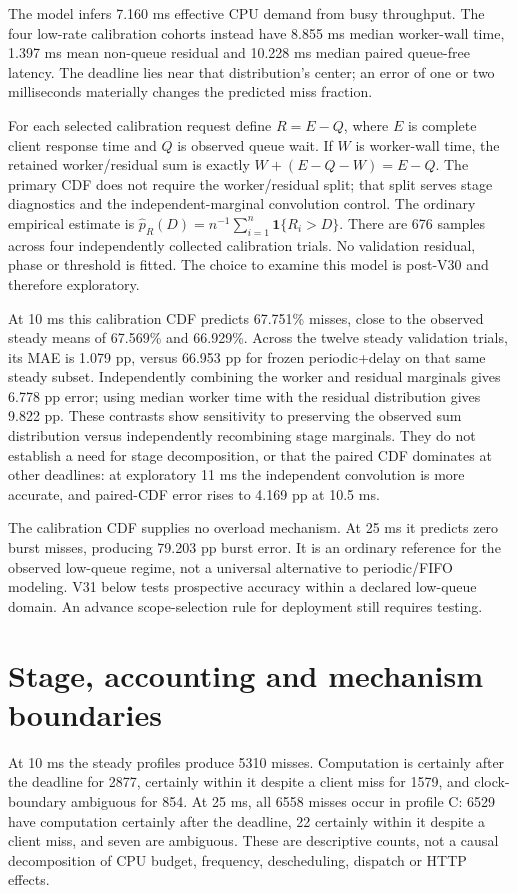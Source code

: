 \documentclass[11pt,a4paper]{article}
\begin{document}
The model infers 7.160 ms effective CPU demand from busy throughput. The four
low-rate calibration cohorts instead have 8.855 ms median worker-wall time,
1.397 ms mean non-queue residual and 10.228 ms median paired queue-free
latency. The deadline lies near that distribution's center; an error of one or
two milliseconds materially changes the predicted miss fraction.

For each selected calibration request define $R=E-Q$, where $E$ is complete
client response time and $Q$ is observed queue wait. If $W$ is worker-wall time,
the retained worker/residual sum is exactly $W+(E-Q-W)=E-Q$. The primary CDF
does not require the worker/residual split; that split serves stage diagnostics
and the independent-marginal convolution control. The ordinary empirical
estimate is $\hat p_R(D)=n^{-1}\sum_{i=1}^{n}\mathbf{1}\{R_i>D\}$.
There are 676 samples across four independently collected calibration trials.
No validation residual, phase or threshold is fitted. The choice to examine
this model is post-V30 and therefore exploratory.

At 10 ms this calibration CDF predicts 67.751\% misses, close to the observed
steady means of 67.569\% and 66.929\%. Across the twelve steady validation trials,
its MAE is 1.079 pp, versus 66.953 pp for frozen periodic+delay on that same
steady subset. Independently combining the worker and residual marginals gives
6.778 pp error; using median worker time with the residual distribution gives
9.822 pp. These contrasts show sensitivity to preserving the observed sum
distribution versus independently recombining stage marginals. They do not
establish a need for stage decomposition, or that the paired
CDF dominates at other deadlines: at exploratory 11 ms the independent
convolution is more accurate, and paired-CDF error rises to 4.169 pp at 10.5 ms.

The calibration CDF supplies no overload mechanism. At 25 ms it predicts zero
burst misses, producing 79.203 pp burst error. It is an ordinary reference for
the observed low-queue regime, not a universal alternative to periodic/FIFO
modeling. V31 below tests prospective accuracy within a declared low-queue
domain. An advance scope-selection rule for deployment still requires testing.

\section{Stage, accounting and mechanism boundaries}

At 10 ms the steady profiles produce 5310 misses. Computation is certainly
after the deadline for 2877, certainly within it despite a client miss for
1579, and clock-boundary ambiguous for 854. At 25 ms, all 6558 misses occur in
profile C: 6529 have computation certainly after the deadline, 22 certainly
within it despite a client miss, and seven are ambiguous. These are
descriptive counts, not a causal decomposition of CPU budget, frequency,
descheduling, dispatch or HTTP effects.
\end{document}
